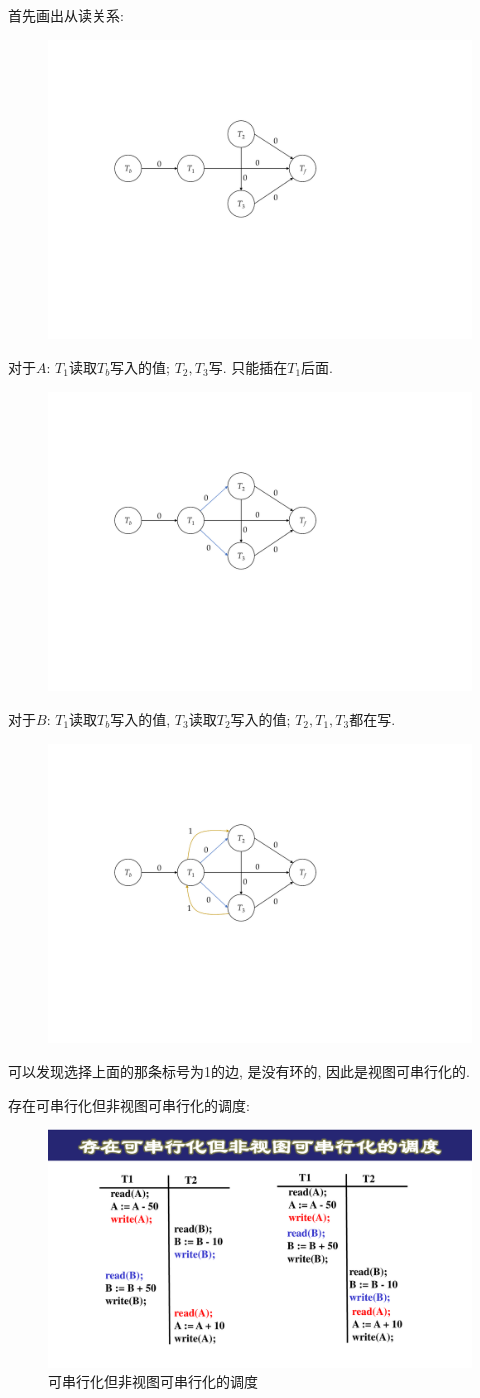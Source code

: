 \begin{solution}
  首先画出从读关系:
  \begin{figure}[H]
      \centering
      \includegraphics[width=.5\textwidth]{figure/视图可串行化-1.pdf}
  \end{figure}
  对于$A$: $T_1$读取$T_b$写入的值; $T_2,T_3$写. 只能插在$T_1$后面.
  \begin{figure}[H]
      \centering
      \includegraphics[width=.5\textwidth]{figure/视图可串行化-2.pdf}
  \end{figure}
  对于$B$: $T_1$读取$T_b$写入的值, $T_3$读取$T_2$写入的值; $T_2,T_1,T_3$都在写.
  \begin{figure}[H]
      \centering
      \includegraphics[width=.5\textwidth]{figure/视图可串行化-3.pdf}
  \end{figure}
  可以发现选择上面的那条标号为1的边, 是没有环的, 因此是视图可串行化的.
\end{solution}

存在可串行化但非视图可串行化的调度:
\begin{figure}[H]
    \centering
    \includegraphics[width=.7\textwidth]{./figure/可串行化.pdf}
    \caption{可串行化但非视图可串行化的调度}
\end{figure}

